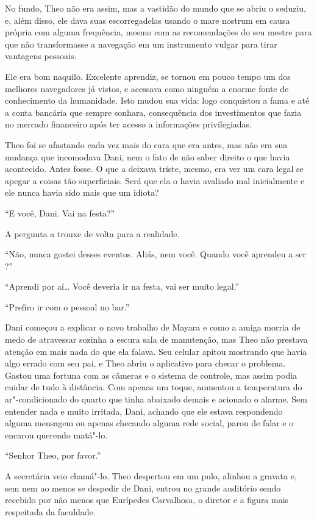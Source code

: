 No fundo, Theo não era assim, mas a vastidão do mundo que se abriu o
seduziu, e, além disso, ele dava suas escorregadelas usando o mare
nostrum em causa própria com alguma frequência, mesmo com as recomendações
do seu mestre para que não transformasse a navegação em um instrumento
vulgar para tirar vantagens pessoais.

Ele era bom naquilo. Excelente aprendiz, se tornou em pouco tempo um dos melhores
navegadores já vistos, e acessava como ninguém
a enorme fonte de conhecimento da humanidade. Isto mudou sua vida: logo
conquistou a fama e até a conta bancária que sempre sonhara,
consequência dos investimentos que fazia no mercado financeiro após ter
acesso a informações privilegiadas.

Theo foi se afastando cada vez mais do cara que era antes, mas não era
sua mudança que incomodava Dani, nem o fato de não saber direito o que
havia acontecido. Antes fosse. O que a deixava triste, mesmo, era ver um
cara legal se apegar a coisas tão superficiais. Será que ela o havia
avaliado mal inicialmente e ele nunca havia sido mais que um idiota?

``E você, Dani. Vai na festa?''

A pergunta a trouxe de volta para a realidade.

``Não, nunca gostei desses eventos. Aliás, nem você. Quando você
aprendeu a ser ?''

``Aprendi por aí\ldots{} Você deveria ir na festa, vai ser muito
legal.''

``Prefiro ir com o pessoal no bar.''

Dani começou a explicar o novo trabalho de Mayara e como a amiga morria
de medo de atravessar sozinha a escura sala de manutenção, mas Theo não
prestava atenção em mais nada do que ela falava. Seu celular apitou
mostrando que havia algo errado com seu pai, e Theo abriu o aplicativo
para checar o problema. Gastou uma fortuna com as câmeras e o sistema de
controle, mas assim podia cuidar de tudo à distância. Com apenas um
toque, aumentou a temperatura do ar"-condicionado do quarto que tinha
abaixado demais e acionado o alarme. Sem entender nada e muito irritada,
Dani, achando que ele estava respondendo alguma mensagem ou apenas
checando alguma rede social, parou de falar e o encarou querendo
matá"-lo.

``Senhor Theo, por favor.''

A secretária veio chamá"-lo. Theo despertou em um pulo, alinhou a gravata
e, sem nem ao menos se despedir de Dani, entrou no grande auditório
sendo recebido por não menos que Eurípedes Carvalhosa, o diretor e a
figura mais respeitada da faculdade.

